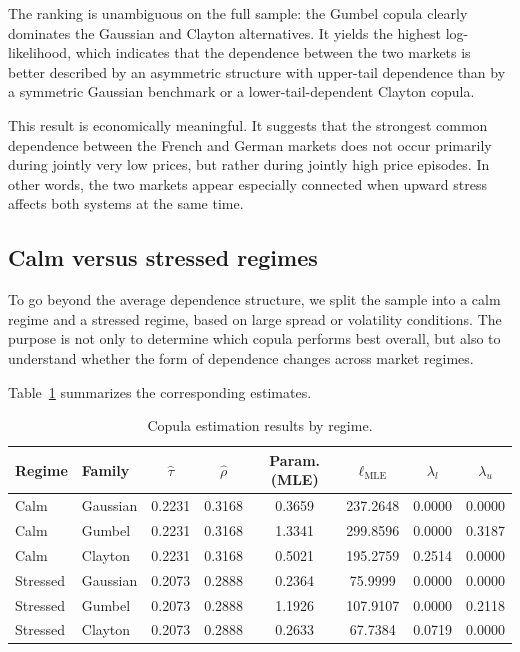 The ranking is unambiguous on the full sample: the Gumbel copula clearly dominates the Gaussian and Clayton alternatives. It yields the highest log-likelihood, which indicates that the dependence between the two markets is better described by an asymmetric structure with upper-tail dependence than by a symmetric Gaussian benchmark or a lower-tail-dependent Clayton copula.

This result is economically meaningful. It suggests that the strongest common dependence between the French and German markets does not occur primarily during jointly very low prices, but rather during jointly high price episodes. In other words, the two markets appear especially connected when upward stress affects both systems at the same time.

\subsection{Calm versus stressed regimes}

To go beyond the average dependence structure, we split the sample into a calm regime and a stressed regime, based on large spread or volatility conditions. The purpose is not only to determine which copula performs best overall, but also to understand whether the form of dependence changes across market regimes.

Table~\ref{tab:copula_regimes} summarizes the corresponding estimates.

\begin{table}[H]
\centering
\caption{Copula estimation results by regime.}
\label{tab:copula_regimes}
\begin{tabular}{llcccccc}
\toprule
Regime & Family & \(\hat\tau\) & \(\hat\rho\) & Param. (MLE) & \(\ell_{\text{MLE}}\) & \(\lambda_l\) & \(\lambda_u\) \\
\midrule
Calm     & Gaussian & 0.2231 & 0.3168 & 0.3659 & 237.2648 & 0.0000 & 0.0000 \\
Calm     & Gumbel   & 0.2231 & 0.3168 & 1.3341 & 299.8596 & 0.0000 & 0.3187 \\
Calm     & Clayton  & 0.2231 & 0.3168 & 0.5021 & 195.2759 & 0.2514 & 0.0000 \\
Stressed & Gaussian & 0.2073 & 0.2888 & 0.2364 & 75.9999  & 0.0000 & 0.0000 \\
Stressed & Gumbel   & 0.2073 & 0.2888 & 1.1926 & 107.9107 & 0.0000 & 0.2118 \\
Stressed & Clayton  & 0.2073 & 0.2888 & 0.2633 & 67.7384  & 0.0719 & 0.0000 \\
\bottomrule
\end{tabular}
\end{table}

